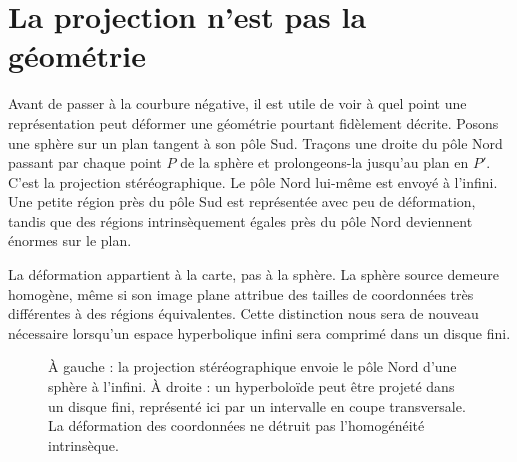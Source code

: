 \section{La projection n’est pas la géométrie}

Avant de passer à la courbure négative, il est utile de voir à quel point une représentation peut déformer une géométrie pourtant fidèlement décrite. Posons une sphère sur un plan tangent à son pôle Sud. Traçons une droite du pôle Nord passant par chaque point \(P\) de la sphère et prolongeons-la jusqu’au plan en \(P'\). C’est la projection stéréographique. Le pôle Nord lui-même est envoyé à l’infini. Une petite région près du pôle Sud est représentée avec peu de déformation, tandis que des régions intrinsèquement égales près du pôle Nord deviennent énormes sur le plan.

La déformation appartient à la carte, pas à la sphère. La sphère source demeure homogène, même si son image plane attribue des tailles de coordonnées très différentes à des régions équivalentes. Cette distinction nous sera de nouveau nécessaire lorsqu’un espace hyperbolique infini sera comprimé dans un disque fini.

\begin{figure}[htbp]
\centering
{}%
\caption{À gauche : la projection stéréographique envoie le pôle Nord d’une sphère à l’infini. À droite : un hyperboloïde peut être projeté dans un disque fini, représenté ici par un intervalle en coupe transversale. La déformation des coordonnées ne détruit pas l’homogénéité intrinsèque.}
\label{fig:c03-projections}
\end{figure}

